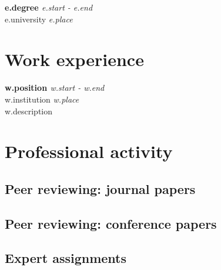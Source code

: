 \documentclass[10pt,letterpaper]{article} %
\begin{document}
{%
    {\bf {{ e.degree }} } \hfill {\em  {{ e.start }} -   {{ e.end }}  } \\
    {{ e.university }}  \hfill {\em {{ e.place}} } \\
    {%
    {%
    {%
    {%
    {%
    {%
{%


\section*{Work experience} %

{%
    {\bf {{ w.position }} } \hfill {\em  {{ w.start }} -   {{ w.end }}  } \\
    {{ w.institution }} \hfill {\em  {{ w.place }}} \\
    {{ w.description }}
{%

\section*{Professional activity}

\subsection*{Peer reviewing: journal papers}

{%

\subsection*{Peer reviewing: conference papers}

{%

\subsection*{Expert assignments}

}}}}}}}}}}}}
\end{document}
